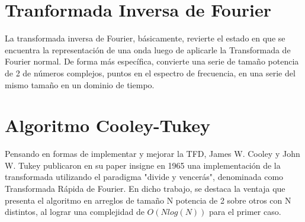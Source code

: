 \documentclass[review,1p]{elsarticle}
\begin{document}
  

\section{Tranformada Inversa de Fourier}
La transformada inversa de Fourier, básicamente, revierte el estado en que se encuentra la representación de una onda luego de aplicarle la Transformada de Fourier normal. De forma más específica, convierte una serie de tamaño potencia de 2 de números complejos, puntos en el espectro de frecuencia, en una serie del mismo tamaño en un dominio de tiempo.\\

\section{Algoritmo Cooley-Tukey}
Pensando en formas de implementar y mejorar la TFD, James W. Cooley y John W. Tukey publicaron en su paper insigne en 1965 una implementación de la transformada utilizando el paradigma "divide y vencerás", denominada como Transformada Rápida de Fourier. En dicho trabajo, se destaca la ventaja que presenta el algoritmo en arreglos de tamaño N potencia de 2 sobre otros con N distintos, al lograr una complejidad de $O(Nlog(N))$ para el primer caso. \\
\end{document}
